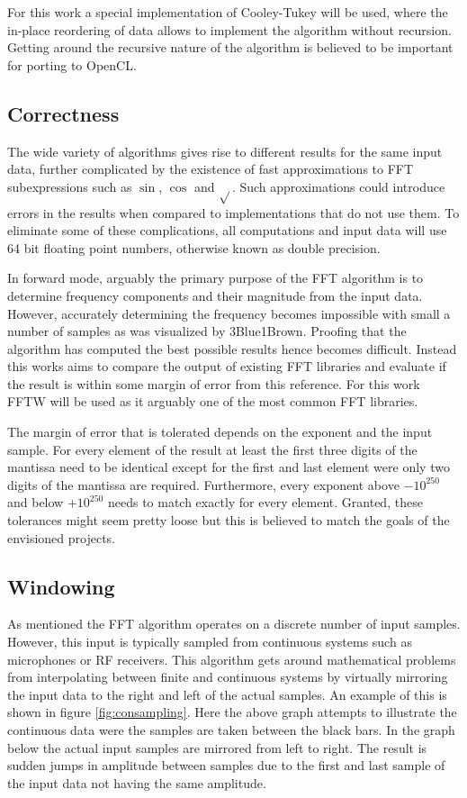 \documentclass[conference]{IEEEtran}
\begin{document}
For this work a special implementation of Cooley-Tukey will be used, where the
in-place reordering of data allows to implement the algorithm without
recursion. Getting around the recursive nature of the algorithm is believed to
be important for porting to OpenCL.

\subsection{Correctness}

The wide variety of algorithms gives rise to different results for the same
input data, further complicated by the existence of fast approximations to
FFT subexpressions such as $\sin{}$, $\cos{}$ and $\sqrt{}$. Such
approximations could introduce errors in the results when compared to
implementations that do not use them. To eliminate some of these complications,
all computations and input data will use 64 bit floating point numbers,
otherwise known as double precision.

In forward mode, arguably the primary purpose of the FFT algorithm is to
determine frequency components and their magnitude from the input data.
However, accurately determining the frequency becomes impossible with small a
number of samples as was visualized by 3Blue1Brown\cite{heisenburg-frequency}.
Proofing that the algorithm has computed the best possible results hence
becomes difficult. Instead this works aims to compare the output of existing
FFT libraries and evaluate if the result is within some margin of error from
this reference. For this work FFTW\cite{FFTW05} will be used as it arguably
one of the most common FFT libraries.

The margin of error that is tolerated depends on the exponent and the input
sample. For every element of the result at least the first three digits of the
mantissa need to be identical except for the first and last element were only
two digits of the mantissa are required. Furthermore, every exponent above
$-10^{250}$ and below $+10^{250}$ needs to match exactly for every element.
Granted, these tolerances might seem pretty loose but this is believed to match
the goals of the envisioned projects.

\subsection{Windowing}

As mentioned the FFT algorithm operates on a discrete number of input samples.
However, this input is typically sampled from continuous systems such as
microphones or RF receivers. This algorithm gets around mathematical problems
from interpolating between finite and continuous systems by virtually
mirroring the input data to the right and left of the actual samples. An
example of this is shown in figure \ref{fig:consampling}. Here the above graph
attempts to illustrate the continuous data were the samples are taken between
the black bars. In the graph below the actual input samples are mirrored from
left to right. The result is sudden jumps in amplitude between samples due to
the first and last sample of the input data not having the same amplitude.
\end{document}
